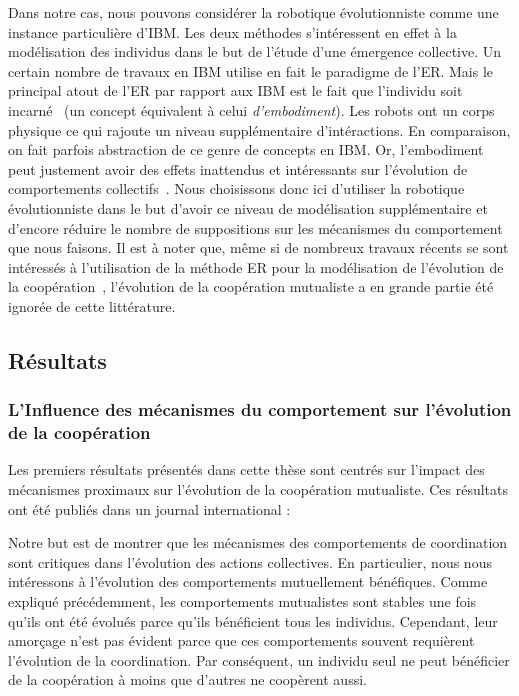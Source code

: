 		Dans notre cas, nous pouvons considérer la robotique évolutionniste comme une instance particulière d'IBM. Les deux méthodes s'intéressent en effet à la modélisation des individus dans le but de l'étude d'une émergence collective. Un certain nombre de travaux en IBM utilise en fait le paradigme de l'ER. Mais le principal atout de l'ER par rapport aux IBM est le fait que l'individu soit incarné~\parencite{Mitri2012} (un concept équivalent à celui \emph{d'embodiment}). Les robots ont un corps physique ce qui rajoute un niveau supplémentaire d'intéractions. En comparaison, on fait parfois abstraction de ce genre de concepts en IBM. Or, l'embodiment peut justement avoir des effets inattendus et intéressants sur l'évolution de comportements collectifs~\parencite{Mitri2009}. Nous choisissons donc ici d'utiliser la robotique évolutionniste dans le but d'avoir ce niveau de modélisation supplémentaire et d'encore réduire le nombre de suppositions sur les mécanismes du comportement que nous faisons. Il est à noter que, même si de nombreux travaux récents se sont intéressés à l'utilisation de la méthode ER pour la modélisation de l'évolution de la coopération~\parencite{Waibel2009, Waibel2011, Montanier2011, Ferrante2015}, l'évolution de la coopération mutualiste a en grande partie été ignorée de cette littérature.


	\subsection{Résultats}

		\subsubsection{L'Influence des mécanismes du comportement sur l'évolution de la coopération}

			Les premiers résultats présentés dans cette thèse sont centrés sur l'impact des mécanismes proximaux sur l'évolution de la coopération mutualiste. Ces résultats ont été publiés dans un journal international :

			\begin{quote}
			\end{quote}

			Notre but est de montrer que les mécanismes des comportements de coordination sont critiques dans l'évolution des actions collectives. En particulier, nous nous intéressons à l'évolution des comportements mutuellement bénéfiques. Comme expliqué précédemment, les comportements mutualistes sont stables une fois qu'ils ont été évolués parce qu'ils bénéficient tous les individus. Cependant, leur amorçage n'est pas évident parce que ces comportements souvent requièrent l'évolution de la coordination. Par conséquent, un individu seul ne peut bénéficier de la coopération à moins que d'autres ne coopèrent aussi.


